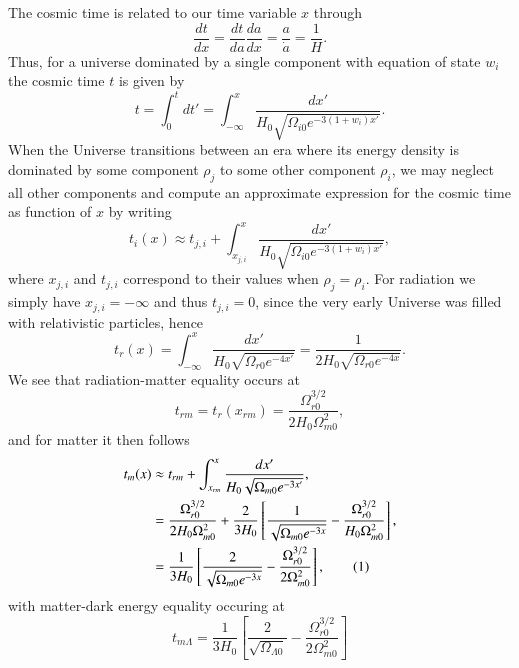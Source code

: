 \documentclass{aa}
\newcommand\numberthis{\addtocounter{equation}{1}\tag{\theequation}}
\begin{document}
The cosmic time is related to our time variable $x$ through
\begin{equation}
  \frac{dt}{dx} = \frac{dt}{da}\frac{da}{dx} = \frac{a}{\dot{a}} = \frac{1}{H}.
\end{equation}
Thus, for a universe dominated by a single component with equation of state $w_i$ the cosmic time $t$ is given by
\begin{equation}
  t = \int_0^t dt' = \int_{-\infty}^{x}\frac{dx'}{H_0\sqrt{\Omega_{i0}e^{-3(1+w_i)x'}}}.
\end{equation}
When the Universe transitions between an era where its energy density is dominated by some component $\rho_j$ to some other component $\rho_i$, we may neglect all other components and compute an approximate expression for the cosmic time as function of $x$ by writing
\begin{equation}
  t_i(x) \approx t_{j,i} + \int_{x_{j,i}}^{x}\frac{dx'}{H_0\sqrt{\Omega_{i0}e^{-3(1+w_i)x'}}},
\end{equation}
where $x_{j,i}$ and $t_{j,i}$ correspond to their values when $\rho_j=\rho_i$. For radiation we simply have $x_{j,i}=-\infty$ and thus $t_{j,i}=0$, since the very early Universe was filled with relativistic particles, hence
\begin{equation}
  t_r(x) = \int_{{-\infty}}^{x}\frac{dx'}{H_0\sqrt{\Omega_{r0}e^{-4x'}}} = \frac{1}{2H_0\sqrt{\Omega_{r0}e^{-4x}}}.
\end{equation}
We see that radiation-matter equality occurs at
\begin{equation}
  t_{rm} = t_r(x_{rm}) = \frac{\Omega_{r0}^{3/2}}{2H_0\Omega_{m0}^2},
\end{equation}
and for matter it then follows
\begin{align*}
  t_m(x) &\approx t_{rm} + \int_{x_{rm}}^{x}\frac{dx'}{H_0\sqrt{\Omega_{m0}e^{-3x'}}}, 
  \\
  &= \frac{\Omega_{r0}^{3/2}}{2H_0\Omega_{m0}^2}+\frac{2}{3H_0}\left[\frac{1}{\sqrt{\Omega_{m0}e^{-3x}}} - \frac{\Omega_{r0}^{3/2}}{H_0\Omega_{m0}^2} \right],
  \\
  &= \frac{1}{3H_0}\left[\frac{2}{\sqrt{\Omega_{m0}e^{-3x}}} - \frac{\Omega_{r0}^{3/2}}{2\Omega^2_{m0}} \right], \numberthis
\end{align*}
with matter-dark energy equality occuring at
\begin{equation}
  t_{m\Lambda} = \frac{1}{3H_0}\left[\frac{2}{\sqrt{\Omega_{\Lambda0}}} - \frac{\Omega_{r0}^{3/2}}{2\Omega^2_{m0}} \right]
\end{equation}
\end{document}
